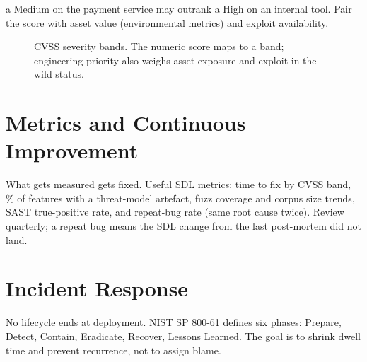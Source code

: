  a Medium on the payment service may outrank a High on an internal tool. Pair the score with asset value (environmental metrics) and exploit availability.

\begin{figure}[h]\centering
{}
\caption{CVSS severity bands. The numeric score maps to a band; engineering priority also weighs asset exposure and exploit-in-the-wild status.}
\label{fig:cvss-bands}
\end{figure}

\section{Metrics and Continuous Improvement}
\label{sec:metrics}
What gets measured gets fixed. Useful SDL metrics: time to fix by CVSS band, \% of features with a threat-model artefact, fuzz coverage and corpus size trends, SAST true-positive rate, and repeat-bug rate (same root cause twice). Review quarterly; a repeat bug means the SDL change from the last post-mortem did not land.

\section{Incident Response}
\label{sec:ir}
No lifecycle ends at deployment. NIST SP 800-61 defines six phases: Prepare, Detect, Contain, Eradicate, Recover, Lessons Learned. The goal is to shrink dwell time and prevent recurrence, not to assign blame.

